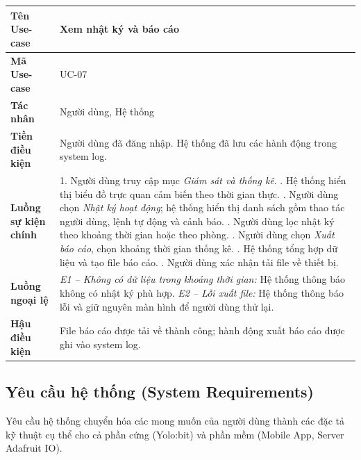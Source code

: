 \begin{table}[H]
\centering
\renewcommand{\arraystretch}{1.4}
\begin{tabular}{|p{3.8cm}|p{10cm}|}
\hline
\textbf{Tên Use-case}       & Xem nhật ký và báo cáo \\ \hline
\textbf{Mã Use-case}        & UC-07 \\ \hline
\textbf{Tác nhân}           & Người dùng, Hệ thống \\ \hline
\textbf{Tiền điều kiện}     & Người dùng đã đăng nhập. Hệ thống đã lưu các hành động trong system log. \\ \hline
\textbf{Luồng sự kiện chính} & 
1. Người dùng truy cập mục \textit{Giám sát và thống kê}. \newline
2. Hệ thống hiển thị biểu đồ trực quan cảm biến theo thời gian thực. \newline
3. Người dùng chọn \textit{Nhật ký hoạt động}; hệ thống hiển thị danh sách gồm thao tác người dùng, lệnh tự động và cảnh báo. \newline
4. Người dùng lọc nhật ký theo khoảng thời gian hoặc theo phòng. \newline
5. Người dùng chọn \textit{Xuất báo cáo}, chọn khoảng thời gian thống kê. \newline
6. Hệ thống tổng hợp dữ liệu và tạo file báo cáo. \newline
7. Người dùng xác nhận tải file về thiết bị. \\ \hline
\textbf{Luồng ngoại lệ}     & 
\textit{E1 -- Không có dữ liệu trong khoảng thời gian:} Hệ thống thông báo không có nhật ký phù hợp. \newline
\textit{E2 -- Lỗi xuất file:} Hệ thống thông báo lỗi và giữ nguyên màn hình để người dùng thử lại. \\ \hline
\textbf{Hậu điều kiện}      & File báo cáo được tải về thành công; hành động xuất báo cáo được ghi vào system log. \\ \hline
\end{tabular}
\end{table}

\subsection{Yêu cầu hệ thống (System Requirements)}

Yêu cầu hệ thống chuyển hóa các mong muốn của người dùng thành các đặc tả kỹ thuật cụ thể cho cả phần cứng (Yolo:bit) và phần mềm (Mobile App, Server Adafruit IO).

